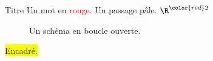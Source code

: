 \documentclass{beamer}
\begin{document}
\begin{slide}{Titre}
    Un mot en \textcolor{red}{rouge}. %
    {\color{blue!20} Un passage pâle.} %
    $\R^{\color{red} 2}$ %
    \begin{figure}
        \caption{Un schéma en {\color[rgb]{1,0,0}boucle ouverte}.} %
    \end{figure}
\end{slide}
\begin{frame}
    \colorbox{yellow}{Encadré.} %
\end{frame}
\end{document}
